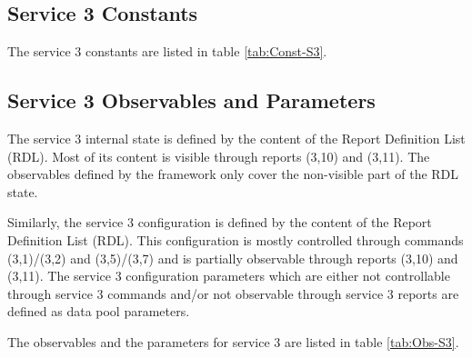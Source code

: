 \documentclass{pnp_article}
\begin{document}
\newpage
{}
\newpage
{}
\newpage
{}
\newpage
{}
\newpage
{}
\newpage
{}
\newpage
{}

\subsection{Service 3 Constants}\label{sec:serv3Const}
The service 3 constants are listed in table \ref{tab:Const-S3}.



\subsection{Service 3 Observables and Parameters}\label{sec:serv3Obs}
The service 3 internal state is defined by the content of the Report Definition List (RDL). Most of its content is visible through reports (3,10) and (3,11). The observables defined by the framework only cover the non-visible part of the RDL state. 

Similarly, the service 3 configuration is defined by the content of the Report Definition List (RDL). This configuration is mostly controlled through commands (3,1)/(3,2) and (3,5)/(3,7) and is partially observable through reports (3,10) and (3,11). The service 3 configuration parameters which are either not controllable through service 3 commands and/or not observable through service 3 reports are defined as data pool parameters. 

The observables and the parameters for service 3 are listed in table \ref{tab:Obs-S3}.

\end{document}
